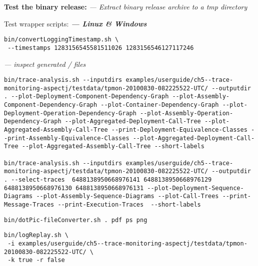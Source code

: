 \begin{compactenum}
\item \textbf{Test the binary release:} \textit{--- Extract binary release archive to a tmp directory}
\begin{compactenum}
\item Test wrapper scripts: \textbf{\textit{--- Linux \& Windows}}
\begin{compactitem}
\item {} 
\setBashListing
\begin{lstlisting}
bin/convertLoggingTimestamp.sh \
 --timestamps 1283156545581511026 1283156546127117246
\end{lstlisting}
\item {} \textit{--- inspect generated / files}
\setBashListing
\begin{lstlisting}
bin/trace-analysis.sh --inputdirs examples/userguide/ch5--trace-monitoring-aspectj/testdata/tpmon-20100830-082225522-UTC/ --outputdir . --plot-Deployment-Component-Dependency-Graph --plot-Assembly-Component-Dependency-Graph --plot-Container-Dependency-Graph --plot-Deployment-Operation-Dependency-Graph --plot-Assembly-Operation-Dependency-Graph --plot-Aggregated-Deployment-Call-Tree --plot-Aggregated-Assembly-Call-Tree --print-Deployment-Equivalence-Classes --print-Assembly-Equivalence-Classes --plot-Aggregated-Deployment-Call-Tree --plot-Aggregated-Assembly-Call-Tree --short-labels

bin/trace-analysis.sh --inputdirs examples/userguide/ch5--trace-monitoring-aspectj/testdata/tpmon-20100830-082225522-UTC/ --outputdir . --select-traces  6488138950668976141 6488138950668976129 6488138950668976130 6488138950668976131 --plot-Deployment-Sequence-Diagrams --plot-Assembly-Sequence-Diagrams --plot-Call-Trees --print-Message-Traces --print-Execution-Traces  --short-labels
\end{lstlisting}

% 
\item {}
\setBashListing
\begin{lstlisting}
bin/dotPic-fileConverter.sh . pdf ps png
\end{lstlisting}
\item {}
\setBashListing
\begin{lstlisting}
bin/logReplay.sh \
 -i examples/userguide/ch5--trace-monitoring-aspectj/testdata/tpmon-20100830-082225522-UTC/ \
 -k true -r false


\end{lstlisting}
\end{compactitem}
\end{compactenum}
\end{compactenum}
